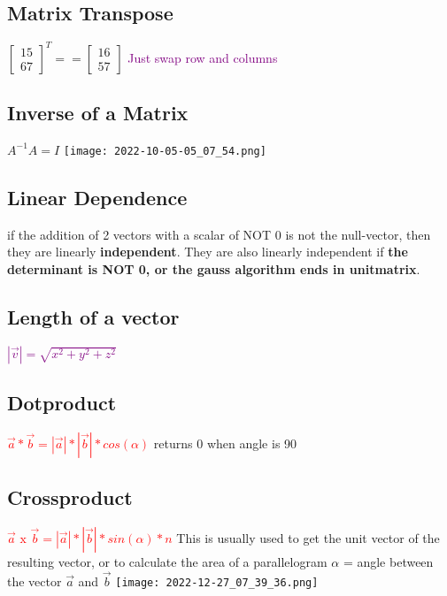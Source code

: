 \documentclass[main.tex,fontsize=12pt,paper=a4,paper=landscape,DIV=calc,]{scrartcl}
\begin{document}
\begin{multicols*}{4}
\subsection{Matrix Transpose}
\(\left[\begin{smallmatrix} 1  5 \\ 6  7 \end{smallmatrix}\right]^T == \left[ \begin{smallmatrix} 1  6 \\ 5  7 \end{smallmatrix}\right]\)\newline
\textcolor{purple}{Just swap row and columns}

\subsection{Inverse of a Matrix}
\(A^{-1}A = I\)\newline
\texttt{[image: 2022-10-05-05\_07\_54.png]}

\subsection{Linear Dependence}
if the addition of 2 vectors with a scalar of NOT 0 is not the null-vector, then they are linearly \textbf{independent}.\newline
They are also linearly independent if \textbf{the determinant is NOT 0, or the gauss algorithm ends in unitmatrix}.

\subsection{Length of a vector}
\textcolor{purple}{\( |\vec{v}| = \sqrt{x^2 + y^2 + z^2} \)}

\subsection{Dotproduct}
\textbf{\textcolor{red}{\( \vec{a} * \vec{b} = |\vec{a}| * |\vec{b}| * cos(\alpha) \)}}\newline
returns 0 when angle is 90

\subsection{Crossproduct}
\textbf{\textcolor{red}{\( \vec{a} \text{ x } \vec{b} = |\vec{a}| * |\vec{b}| * sin(\alpha) * n\)}}\newline
This is usually used to get the unit vector of the resulting vector, or to\newline
calculate the area of a parallelogram\newline
\(\alpha\) = angle between the vector \(\vec{a}\) and \(\vec{b}\)\newline
\texttt{[image: 2022-12-27\_07\_39\_36.png]}


\end{multicols*}
\end{document}
